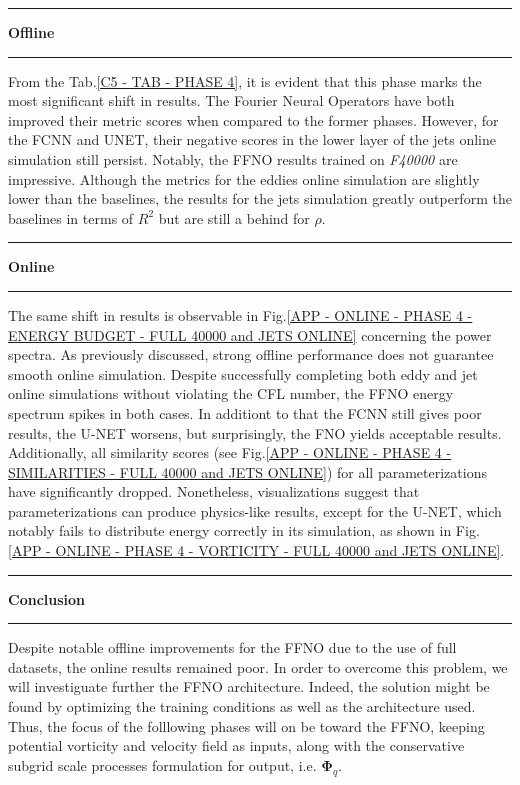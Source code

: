 \rule[0cm]{\linewidth}{0.025cm}
\begin{center}
\small \textbf{Offline}
\end{center}
\rule[0.3cm]{\linewidth}{0.025cm}

From the Tab.\ref{C5 - TAB - PHASE 4}, it is evident that this phase marks the most significant shift in results. The Fourier Neural Operators have both improved their metric scores when compared to the former phases. However, for the FCNN and UNET, their negative scores in the lower layer of the jets online simulation still persist. Notably, the FFNO results trained on \textit{F40000} are impressive. Although the metrics for the eddies online simulation are slightly lower than the baselines, the results for the jets simulation greatly outperform the baselines in terms of $R^2$ but are still a behind for $\rho$.\\

\rule[0cm]{\linewidth}{0.025cm}
\begin{center}
\small \textbf{Online}
\end{center}
\rule[0.3cm]{\linewidth}{0.025cm}

The same shift in results is observable in Fig.\ref{APP - ONLINE - PHASE 4 - ENERGY BUDGET -  FULL 40000 and JETS ONLINE} concerning the power spectra. As previously discussed, strong offline performance does not guarantee smooth online simulation. Despite successfully completing both eddy and jet online simulations without violating the CFL number, the FFNO energy spectrum spikes in both cases. In additiont to that the FCNN still gives poor results, the U-NET worsens, but surprisingly, the FNO yields acceptable results. Additionally, all similarity scores (see Fig.\ref{APP - ONLINE - PHASE 4 - SIMILARITIES -  FULL 40000 and JETS ONLINE}) for all parameterizations have significantly dropped. Nonetheless, visualizations suggest that parameterizations can produce physics-like results, except for the U-NET, which notably fails to distribute energy correctly in its simulation, as shown in Fig.\ref{APP - ONLINE - PHASE 4 - VORTICITY -  FULL 40000 and JETS ONLINE}.\\

\rule[0cm]{\linewidth}{0.025cm}
\begin{center}
\small \textbf{Conclusion}
\end{center}
\rule[0.3cm]{\linewidth}{0.025cm}

Despite notable offline improvements for the FFNO due to the use of full datasets, the online results remained poor. In order to overcome this problem, we will investiguate further the FFNO architecture. Indeed, the solution might be found by optimizing the training conditions as well as the architecture used. Thus, the focus of the folllowing phases will on be toward the FFNO, keeping potential vorticity and velocity field as inputs, along with the conservative subgrid scale processes formulation for output, i.e. $\mathbf{\Phi}_q$.

